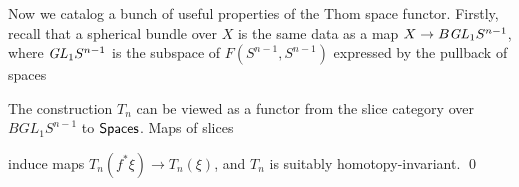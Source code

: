 Now we catalog a bunch of useful properties of the Thom space functor.  Firstly, recall that a spherical bundle over $X$ is the same data as a map $X \to B \mathit{GL}_1 S^{n-1}$, where $\mathit{GL}_1 S^{n-1}$ is the subspace of $F(S^{n-1}, S^{n-1})$ expressed by the pullback of spaces
\begin{center}
\end{center}

\begin{lemma}\label{ThomConstructionIsASliceFunctor}
The construction $T_n$ can be viewed as a functor from the slice category over $BGL_1 S^{n-1}$ to $\mathsf{Spaces}$.  Maps of slices
\begin{center}
\end{center}
induce maps $T_n(f^* \xi) \to T_n(\xi)$, and $T_n$ is suitably homotopy-invariant. \qed
\end{lemma}

